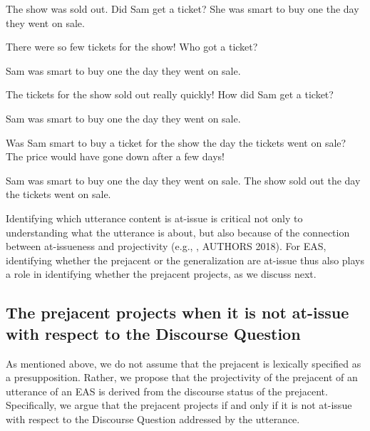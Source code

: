 \documentclass[11pt,fleqn]{article}
\newcommand{\6}{\mbox{$[\hspace*{-.6mm}[$}}
\newcommand{\9}{\mbox{$]\hspace*{-.6mm}]$}}
\begin{document}
\begin{exe}
\ex\label{ai}

\begin{xlist}
\ex
\begin{xlist}
 The show was sold out. Did Sam get a ticket?
 She was smart to buy one the day they went on sale.
\end{xlist}

\ex
\begin{xlist}
 There were so few tickets for the show! Who got a ticket?

 Sam was smart to buy one the day they went on sale. 

\end{xlist}

\ex
\begin{xlist}
 The tickets for the show sold out really quickly! How did Sam get a ticket?

 Sam was smart to buy one the day they went on sale.

\end{xlist}

\ex
\begin{xlist}
 Was Sam smart to buy a ticket for the show the day the tickets went on sale? The price would have gone down after a few days!

 Sam was smart to buy one the day they went on sale. The show sold out the day the tickets went on sale.

\end{xlist}

\end{xlist}
\end{exe}

Identifying which utterance content is at-issue is critical not only to understanding what the utterance is about, but also because of the connection between at-issueness and projectivity (e.g., \citealt{potts05,brst-salt10,best-question,brst-ar}, AUTHORS 2018). For EAS, identifying whether the prejacent or the generalization are at-issue thus also plays a role in identifying whether the prejacent projects, as we discuss next.

\subsection{The prejacent projects when it is not at-issue with respect to the Discourse Question}

As mentioned above, we do not assume that the prejacent is lexically specified as a presupposition. Rather, we propose that the projectivity of the prejacent of an utterance of an EAS is derived from the discourse status of the prejacent. Specifically, we argue that the prejacent projects if and only if it is not at-issue with respect to the Discourse Question addressed by the utterance. 
\end{document}
